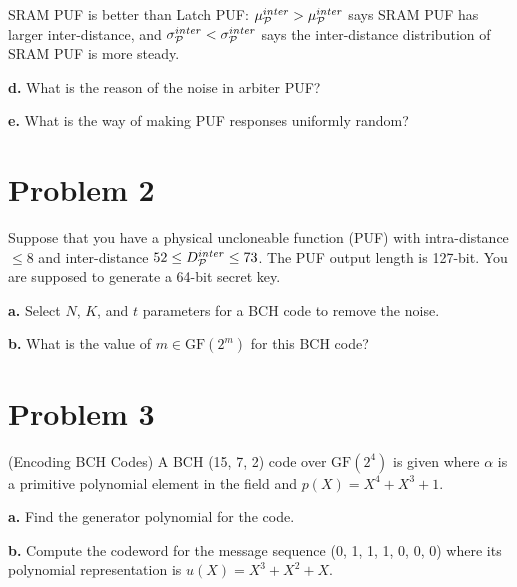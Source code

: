 \documentclass[12pt]{article}
\theoremstyle{plain}
\begin{document}
\Sol SRAM PUF is better than Latch PUF: $\mu_{\mathcal{P}}^{inter} > \mu_{\mathcal{P}}^{inter}$ says SRAM PUF has larger inter-distance, and $\sigma_{\mathcal{P}}^{inter} < \sigma_{\mathcal{P}}^{inter}$ says the inter-distance distribution of SRAM PUF is more steady.

{\bf d.} What is the reason of the noise in arbiter PUF?

\Sol 

{\bf e.} What is the way of making PUF responses uniformly random?

\Sol 

\section{Problem 2}
Suppose that you have a physical uncloneable function (PUF) with
intra-distance $\leq 8$ and inter-distance $52 \leq D_{\mathcal{P}}^{inter} \leq 73$. The PUF
output length is 127-bit. You are supposed to generate a 64-bit secret
key.

{\bf a.} Select $N$, $K$, and $t$ parameters for a BCH code to remove the noise.

\Sol 

\newcommand{\GF}{\textrm{GF}}
{\bf b.} What is the value of $m \in \GF(2^m)$ for this BCH code?

\Sol 

\section{Problem 3}

(Encoding BCH Codes) A BCH (15, 7, 2) code over $\GF(2^4)$ is given where $\alpha$ is a primitive polynomial element in the field and $p(X) = X^4 + X^3 + 1$.

{\bf a.} Find the generator polynomial for the code.

\Sol 

{\bf b.} Compute the codeword for the message sequence (0, 1, 1, 1, 0, 0, 0)
where its polynomial representation is $u(X) = X^3 + X^2 + X$.

\Sol 
\end{document}
